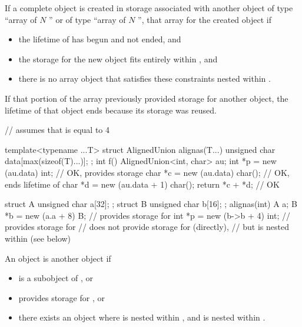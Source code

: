 \pnum
{}%
If a complete object is created
in storage associated with another object 
of type ``array of $N$ '' or
of type ``array of $N$ '',
that array 
for the created object if
\begin{itemize}
\item
the lifetime of  has begun and not ended, and
\item
the storage for the new object fits entirely within , and
\item
there is no array object that satisfies these constraints nested within .
\end{itemize}
\begin{note}
If that portion of the array
previously provided storage for another object,
the lifetime of that object ends
because its storage was reused.
\end{note}
\begin{example}
\begin{codeblock}
// assumes that  is equal to 4

template<typename ...T>
struct AlignedUnion {
  alignas(T...) unsigned char data[max(sizeof(T)...)];
};
int f() {
  AlignedUnion<int, char> au;
  int *p = new (au.data) int;           // OK,  provides storage
  char *c = new (au.data) char();       // OK, ends lifetime of 
  char *d = new (au.data + 1) char();
  return *c + *d;                       // OK
}

struct A { unsigned char a[32]; };
struct B { unsigned char b[16]; };
alignas(int) A a;
B *b = new (a.a + 8) B;                 //  provides storage for 
int *p = new (b->b + 4) int;            //  provides storage for 
                                        //  does not provide storage for  (directly),
                                        // but  is nested within  (see below)
\end{codeblock}
\end{example}

\pnum
{}%
An object  is  another object  if
\begin{itemize}
\item
{} is a subobject of , or
\item
{} provides storage for , or
\item
there exists an object 
where  is nested within ,
and  is nested within .
\end{itemize}

